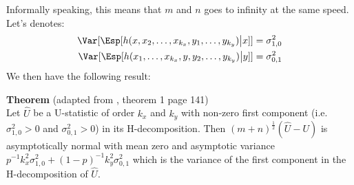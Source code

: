 \documentclass[12pt]{article}
\begin{document}
Informally speaking, this means that \(m\) and \(n\) goes to infinity
  at the same speed. Let's denotes:
\begin{align*}
\Var[\Esp[h(x,x_2,\ldots,x_{k_x},y_1,\ldots,y_{k_y}) \big| x]] &= \sigma^2_{1,0} \\
\Var[\Esp[h(x_1,\ldots,x_{k_x},y,y_2,\ldots,y_{k_y}) \big| y]] &= \sigma^2_{0,1} 
\end{align*}
We then have the following result:

\bigskip

\textbf{Theorem} (adapted from \cite{lee1990u}, theorem 1 page 141)
 \\ Let \(\hat{U}\) be a U-statistic of order \(k_x\) and
 \(k_y\) with non-zero first component (i.e. \(\sigma^2_{1,0}>0\) and
 \(\sigma^2_{0,1}>0\)) in its H-decomposition. Then
 \((m+n)^{\frac{1}{2}} (\hat{U}-U)\) is asymptotically normal with
 mean zero and asymptotic variance \(p^{-1} k_x^2
 \sigma^2_{1,0}+(1-p)^{-1} k_y^2 \sigma^2_{0,1}\) which is the
 variance of the first component in the H-decomposition of
 \(\hat{U}\).

\bigskip
\end{document}
